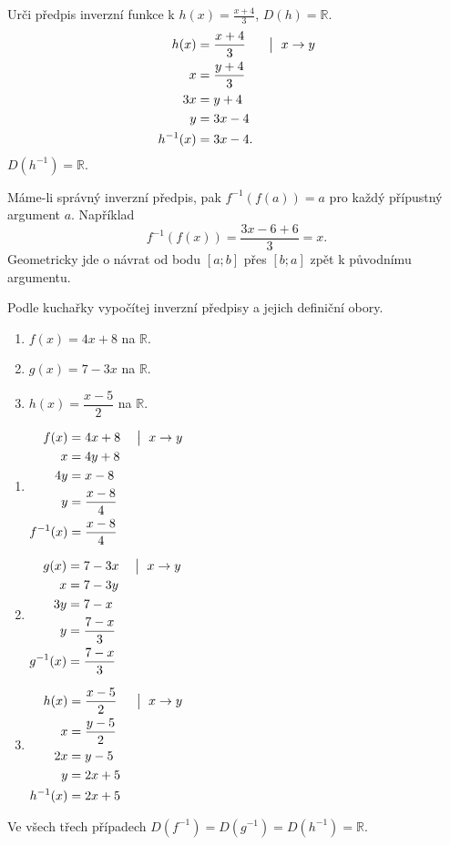 \documentclass[11pt,a4paper]{article}
\begin{document}
\clearpage
\begin{prikladReseniBox}[title={Příklad 3}]
Urči předpis inverzní funkce k $h(x)=\frac{x+4}{3}$, $D(h)=\mathbb R$.
\tcblower
\[
\begin{aligned}
h(x)&=\frac{x+4}{3} &&\bigm|\ x\to y\\
x&=\frac{y+4}{3}\\
3x&=y+4\\
y&=3x-4\\
h^{-1}(x)&=3x-4.
\end{aligned}
\]
$D(h^{-1})=\mathbb R$.
\end{prikladReseniBox}

Máme-li správný inverzní předpis, pak $f^{-1}(f(a))=a$ pro každý přípustný argument $a$. Například
\[
f^{-1}(f(x))=\frac{3x-6+6}{3}=x.
\]
Geometricky jde o návrat od bodu $[a;b]$ přes $[b;a]$ zpět k původnímu argumentu.

\begin{zadaniReseniBox}[title={Samostatná práce 1}]
Podle kuchařky vypočítej inverzní předpisy a jejich definiční obory.
\begin{enumerate}[label=\alph*)]
\item $f(x)=4x+8$ na $\mathbb R$.
\item $g(x)=7-3x$ na $\mathbb R$.
\item $h(x)=\dfrac{x-5}{2}$ na $\mathbb R$.
\end{enumerate}
\tcblower
\begin{enumerate}[label=\alph*)]
\item
\(\displaystyle\begin{aligned}f(x)&=4x+8 &&\bigm|\ x\to y\\x&=4y+8\\4y&=x-8\\y&=\frac{x-8}{4}\\f^{-1}(x)&=\frac{x-8}{4}\end{aligned}\)
\item
\(\displaystyle\begin{aligned}g(x)&=7-3x &&\bigm|\ x\to y\\x&=7-3y\\3y&=7-x\\y&=\frac{7-x}{3}\\g^{-1}(x)&=\frac{7-x}{3}\end{aligned}\)
\item
\(\displaystyle\begin{aligned}h(x)&=\frac{x-5}{2} &&\bigm|\ x\to y\\x&=\frac{y-5}{2}\\2x&=y-5\\y&=2x+5\\h^{-1}(x)&=2x+5\end{aligned}\)
\end{enumerate}
Ve všech třech případech $D(f^{-1})=D(g^{-1})=D(h^{-1})=\mathbb R$.
\end{zadaniReseniBox}
\end{document}
